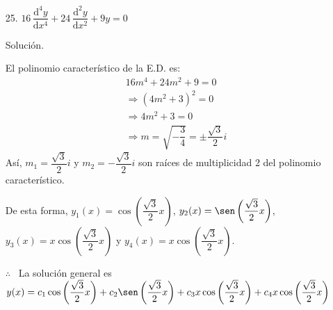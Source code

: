 \documentclass[fleqn]{article}
\begin{document}
    \begin{enumerate}
        \item[25.] $ 16 \, \dfrac{\mathrm{d}^4 y}{\mathrm{d} x^4} + 24 \, \dfrac{\mathrm{d}^2 y}{\mathrm{d} x^2} + 9y = 0 $ \par
        Solución. \par 
        El polinomio característico de la E.D. es: 
        \begin{align*}
            & 16m^4+24m^2+9 = 0 \\
            & \Longrightarrow (4m^2+3)^2 = 0 \\
            & \Longrightarrow 4m^2+3 = 0 \\
            & \Longrightarrow m = \sqrt{-\dfrac{3}{4}} = \pm \dfrac{\sqrt{3}}{2}i
        \end{align*}
        Así, $ m_1 = \dfrac{\sqrt{3}}{2}i $ y $ m_2 = -\dfrac{\sqrt{3}}{2}i $ son raíces de multiplicidad 2 del polinomio característico. \par 
        De esta forma, $ y_1(x) = \cos\left(\dfrac{\sqrt{3}}{2}x \right) $, $ y_2(x) = \sen\left(\dfrac{\sqrt{3}}{2}x \right) $, $ y_3(x) = x\cos\left(\dfrac{\sqrt{3}}{2}x \right) $ y $ y_4(x) = x\cos\left(\dfrac{\sqrt{3}}{2}x \right) $. \par 
        $ \therefore $ \, La solución general es $ y(x) = c_1 \cos\left(\dfrac{\sqrt{3}}{2}x \right) + c_2 \sen\left(\dfrac{\sqrt{3}}{2}x \right) + c_3 x\cos\left(\dfrac{\sqrt{3}}{2}x \right) + c_4 x\cos\left(\dfrac{\sqrt{3}}{2}x \right) $
    \end{enumerate}
\end{document}

